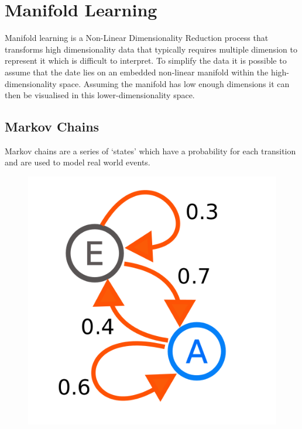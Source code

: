 \section{Manifold Learning}
Manifold learning is a Non-Linear Dimensionality Reduction process that transforms high dimensionality data that typically requires multiple dimension to represent it which is difficult to interpret. To simplify the data it is possible to assume that the date lies on an embedded non-linear manifold within the high-dimensionality space. Assuming the manifold has low enough dimensions it can then be visualised in this lower-dimensionality space.

\subsection{Markov Chains}
Markov chains are a series of `states' which have a probability for each transition and are used to model real world events.

\begin{figure}[h]
    \centering
    \includegraphics[height=0.25\textheight]{fig03/markov}
    \label{fig:kinect}
\end{figure}

